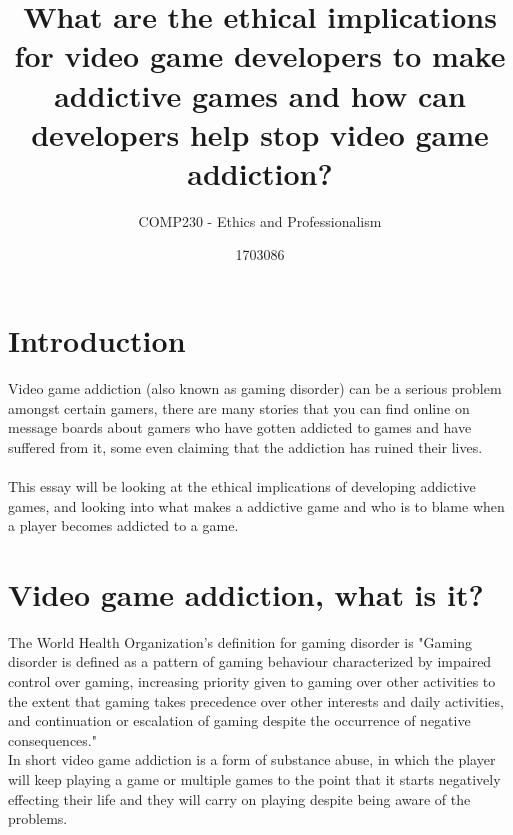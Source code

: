 \documentclass{scrartcl}
\title{What are the ethical implications for video game developers to make addictive games and how can developers help stop video game addiction?}
\subtitle{COMP230 - Ethics and Professionalism}
\author{1703086}
\begin{document}
\maketitle


\section{Introduction}
Video game addiction (also known as gaming disorder) can be a serious problem amongst certain gamers, there are many stories that you can find online on message boards about gamers who have gotten addicted to games and have suffered from it, some even claiming that the addiction has ruined their lives.
\\
\\
This essay will be looking at the ethical implications of developing addictive games, and looking into what makes a addictive game and who is to blame when a player becomes addicted to a game.  

\section{Video game addiction, what is it?}
The World Health Organization's definition for gaming disorder is "Gaming disorder is defined as a pattern of gaming behaviour characterized by impaired control over gaming, increasing priority given to gaming over other activities to the extent that gaming takes precedence over other interests and daily activities, and continuation or escalation of gaming despite the occurrence of negative consequences."
\\
In short video game addiction is a form of substance abuse, in which the player will keep playing a game or multiple games to the point that it starts negatively effecting their life and they will carry on playing despite being aware of the problems.\cite{Addiction1, Addiction2}
\end{document}
